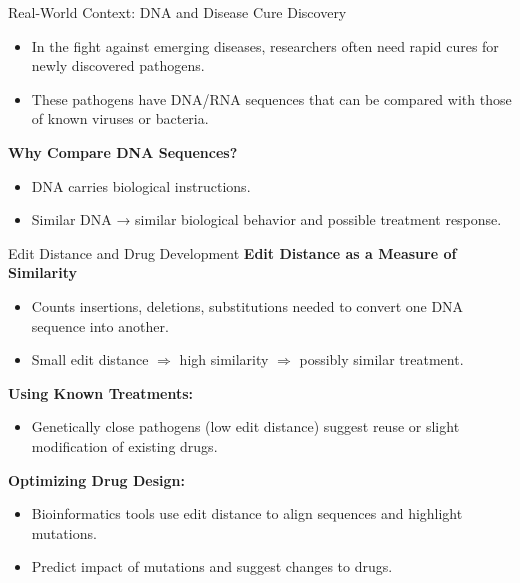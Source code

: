\begin{frame}{Real-World Context: DNA and Disease Cure Discovery}
\begin{itemize}
    \item In the fight against emerging diseases, researchers often need rapid cures for newly discovered pathogens.
    \item These pathogens have DNA/RNA sequences that can be compared with those of known viruses or bacteria.
\end{itemize}

\vspace{0.4cm}

\textbf{Why Compare DNA Sequences?}
\begin{itemize}
    \item DNA carries biological instructions.
    \item Similar DNA → similar biological behavior and possible treatment response.
\end{itemize}
\end{frame}

\begin{frame}{Edit Distance and Drug Development}
\textbf{Edit Distance as a Measure of Similarity}
\begin{itemize}
    \item Counts insertions, deletions, substitutions needed to convert one DNA sequence into another.
    \item Small edit distance $\Rightarrow$ high similarity $\Rightarrow$ possibly similar treatment.
\end{itemize}

\vspace{0.3cm}

\textbf{Using Known Treatments:}
\begin{itemize}
    \item Genetically close pathogens (low edit distance) suggest reuse or slight modification of existing drugs.
\end{itemize}

\vspace{0.3cm}

\textbf{Optimizing Drug Design:}
\begin{itemize}
    \item Bioinformatics tools use edit distance to align sequences and highlight mutations.
    \item Predict impact of mutations and suggest changes to drugs.
\end{itemize}
\end{frame}


